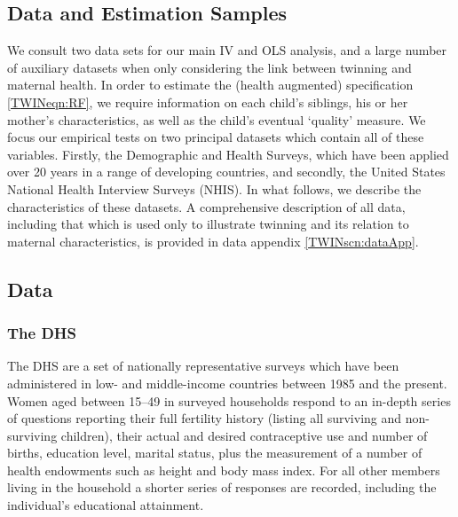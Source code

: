 \documentclass[subeqn]{article}
\begin{document}
\begin{spacing}{1.4}
\section{Data and Estimation Samples}              \label{TWINscn:data}
We consult two data sets for our main IV and OLS analysis, and a large number of
auxiliary datasets when only considering the link between twinning and maternal
health.  In order to estimate the (health augmented) specification 
\ref{TWINeqn:RF}, we require information on each child's siblings, his or her
mother's characteristics, as well as the child's eventual `quality' measure. 
We focus our empirical tests on two principal datasets which contain all of 
these variables.  Firstly, the Demographic and Health Surveys, which have been 
applied over 20 years in a range of developing countries, and secondly, the 
United States National Health Interview Surveys (NHIS).  In what follows, we 
describe the characteristics of these datasets.  A comprehensive description of 
all data, including that which is used only to illustrate twinning and its 
relation to maternal characteristics, is provided in data appendix 
\ref{TWINscn:dataApp}.

\subsection{Data}                                  \label{TWINsscn:data}
\subsubsection{The DHS}
The DHS are a set of nationally representative surveys which have been 
administered in low- and middle-income countries between 1985 and the present. 
Women aged between 15--49 in surveyed households respond to an in-depth series 
of questions reporting their full fertility history (listing all surviving and 
non-surviving children), their actual and desired contraceptive use and number 
of births, education level, marital status, plus the measurement of a number of 
health endowments such as height and body mass index. For all other members 
living in the household a shorter series of responses are recorded, including 
the individual's educational attainment.


\end{spacing}
\end{document}

